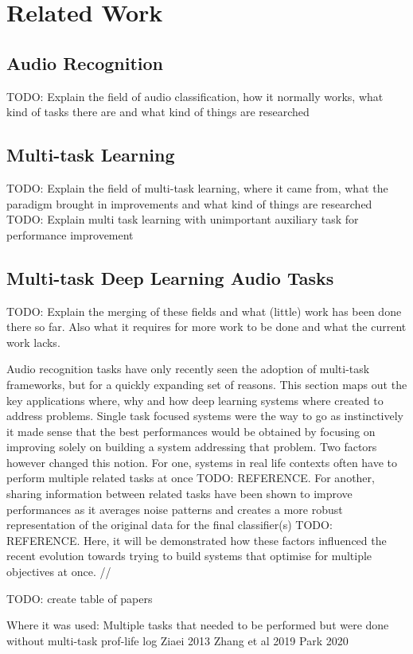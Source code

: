 \chapter{Related Work}

\section{Audio Recognition}
TODO: Explain the field of audio classification, how it normally works, what kind of tasks there are and what kind of things are researched

\section{Multi-task Learning}
TODO: Explain the field of multi-task learning, where it came from, what the paradigm brought in improvements and what kind of things are researched
TODO: Explain multi task learning with unimportant auxiliary task for performance improvement

\section{Multi-task Deep Learning Audio Tasks}
TODO: Explain the merging of these fields and what (little) work has been done there so far. Also what it requires for more work to be done and what the current work lacks.

Audio recognition tasks have only recently seen the adoption of multi-task frameworks, but for a quickly expanding set of reasons. This section maps out the key applications where, why and how deep learning systems where created to address problems. Single task focused systems were the way to go as instinctively it made sense that the best performances would be obtained by focusing on improving solely on building a system addressing that problem. Two factors however changed this notion. For one, systems in real life contexts often have to perform multiple related tasks at once TODO: REFERENCE. For another, sharing information between related tasks have been shown to improve performances as it averages noise patterns and creates a more robust representation of the original data for the final classifier(s) TODO: REFERENCE. Here, it will be demonstrated how these factors influenced the recent evolution towards trying to build systems that optimise for multiple objectives at once. //

TODO: create table of papers

Where it was used:
Multiple tasks that needed to be performed but were done without multi-task
prof-life log Ziaei 2013
Zhang et al 2019
Park 2020



